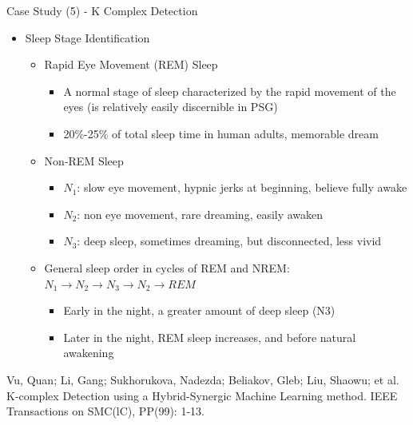 \documentclass[
 size=14pt,
 paper=smartboard,  %
 mode=present, 		%
 display=slides, 	%
 pauseslide,
 fleqn,leqno]{powerdot}{}
\begin{document}
\begin{slide}{Case Study (5) - K Complex Detection}
\begin{itemize}
\item Sleep Stage Identification
\begin{itemize}
\item<2->
Rapid Eye Movement (REM) Sleep
\begin{itemize}
\item<2->
A normal stage of sleep characterized by the rapid movement of the eyes
(is relatively easily discernible in PSG)
\item<2->
20\%-25\% of total sleep time in human adults, memorable dream
\end{itemize}
\item<3->
{Non-REM Sleep}
\begin{itemize}
\item<3->
\textbf{$N_1$}: slow eye movement, hypnic jerks at beginning, believe fully awake
\item<3->
\textbf{$N_2$}: non eye movement, rare dreaming, easily awaken
\item<3->
\textbf{$N_3$}: deep sleep, sometimes dreaming, but disconnected, less vivid
\end{itemize}
\item<4->
General sleep order in cycles of REM and NREM:
$N_1 \rightarrow N_2 \rightarrow N_3 \rightarrow N_2 \rightarrow REM$
\begin{itemize}
\item<4->
Early in the night, a greater amount of deep sleep (N3)
\item<4->
Later in the night, REM sleep increases, and before natural awakening
\end{itemize}
\end{itemize}
\end{itemize}
\footnotesize{Vu, Quan; Li, Gang; Sukhorukova, Nadezda;
Beliakov, Gleb; Liu, Shaowu; et al.
K-complex Detection using a Hybrid-Synergic Machine Learning method.
IEEE Transactions on SMC(lC), PP(99): 1-13.}
\end{slide}
\end{document}
